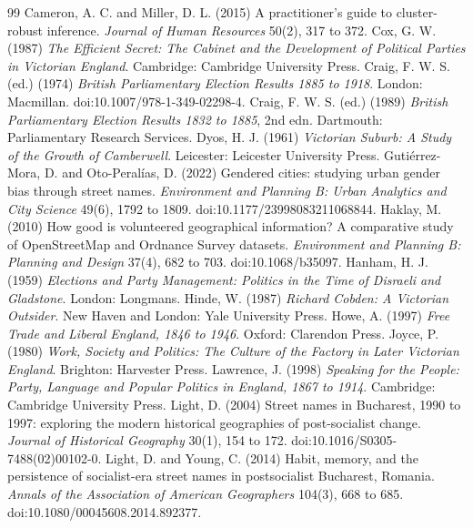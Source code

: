 \documentclass[11pt,a4paper]{article}
\begin{document}
\begin{thebibliography}{99}
 Cameron, A. C. and Miller, D. L. (2015) A practitioner's guide to cluster-robust inference. \textit{Journal of Human Resources} 50(2), 317 to 372.
 Cox, G. W. (1987) \textit{The Efficient Secret: The Cabinet and the Development of Political Parties in Victorian England}. Cambridge: Cambridge University Press.
 Craig, F. W. S. (ed.) (1974) \textit{British Parliamentary Election Results 1885 to 1918}. London: Macmillan. doi:10.1007/978-1-349-02298-4.
 Craig, F. W. S. (ed.) (1989) \textit{British Parliamentary Election Results 1832 to 1885}, 2nd edn. Dartmouth: Parliamentary Research Services.
 Dyos, H. J. (1961) \textit{Victorian Suburb: A Study of the Growth of Camberwell}. Leicester: Leicester University Press.
 Gutiérrez-Mora, D. and Oto-Peralías, D. (2022) Gendered cities: studying urban gender bias through street names. \textit{Environment and Planning B: Urban Analytics and City Science} 49(6), 1792 to 1809. doi:10.1177/23998083211068844.
 Haklay, M. (2010) How good is volunteered geographical information? A comparative study of OpenStreetMap and Ordnance Survey datasets. \textit{Environment and Planning B: Planning and Design} 37(4), 682 to 703. doi:10.1068/b35097.
 Hanham, H. J. (1959) \textit{Elections and Party Management: Politics in the Time of Disraeli and Gladstone}. London: Longmans.
 Hinde, W. (1987) \textit{Richard Cobden: A Victorian Outsider}. New Haven and London: Yale University Press.
 Howe, A. (1997) \textit{Free Trade and Liberal England, 1846 to 1946}. Oxford: Clarendon Press.
 Joyce, P. (1980) \textit{Work, Society and Politics: The Culture of the Factory in Later Victorian England}. Brighton: Harvester Press.
 Lawrence, J. (1998) \textit{Speaking for the People: Party, Language and Popular Politics in England, 1867 to 1914}. Cambridge: Cambridge University Press.
 Light, D. (2004) Street names in Bucharest, 1990 to 1997: exploring the modern historical geographies of post-socialist change. \textit{Journal of Historical Geography} 30(1), 154 to 172. doi:10.1016/S0305-7488(02)00102-0.
 Light, D. and Young, C. (2014) Habit, memory, and the persistence of socialist-era street names in postsocialist Bucharest, Romania. \textit{Annals of the Association of American Geographers} 104(3), 668 to 685. doi:10.1080/00045608.2014.892377.

\end{thebibliography}
\end{document}
